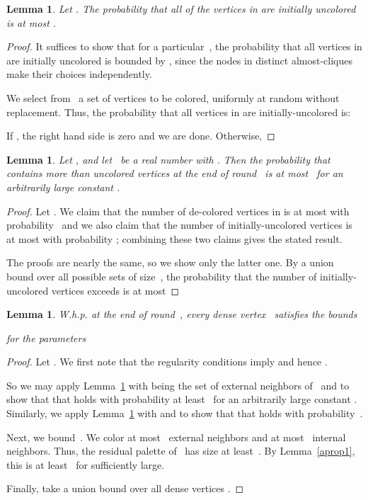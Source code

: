 \documentclass[11pt]{amsart}
\newtheorem{lemma}[theorem]{Lemma}
\begin{document}
\begin{lemma}
\label{prop2}
Let . The probability that all of the vertices in  are initially uncolored is at most .
\end{lemma}
\begin{proof}
It suffices to show that for a particular~, the probability that all vertices in  are initially uncolored is bounded by , since the nodes in distinct almost-cliques make their choices independently.

We select from~ a set of  vertices to be colored, uniformly at random without replacement. Thus, the probability that all vertices in  are initially-uncolored is:
{\allowdisplaybreaks

If , the right hand side is zero and we are done. Otherwise,

}
\end{proof}

\begin{lemma}
\label{prop3}
Let , and let~ be a real number with . Then the probability that~ contains more than  uncolored vertices at the end of round~ is at most~ for an arbitrarily large constant .
\end{lemma}
\begin{proof}
Let . We claim that the number of de-colored vertices in  is at most  with probability~ and we also claim that the number of initially-uncolored vertices is at most  with probability ; combining these two claims gives the stated result.

The proofs are nearly the same, so we show only the latter one. By a union bound over all possible sets of size~, the probability that the number of initially-uncolored vertices exceeds  is at most
{\allowdisplaybreaks

}
\end{proof}

\begin{lemma}
\label{r-prop1}
W.h.p. at the end of round~, every dense vertex~ satisfies the bounds

for the parameters

\end{lemma}
\begin{proof}
Let . We first note that the regularity conditions imply  and hence .

So we may apply Lemma~\ref{prop3} with  being the set of external neighbors of~ and  to show that that  holds with probability at least~ for an arbitrarily large constant . Similarly, we apply Lemma~\ref{prop3} with  and  to show that that  holds with probability~.  

Next, we bound~. We color at most~ external neighbors and at most~ internal neighbors. Thus, the residual palette of~ has size at least~. By Lemma~\ref{aprop1}, this is at least~ for  sufficiently large.

Finally, take a union bound over all dense vertices .
\end{proof}
\end{document}
